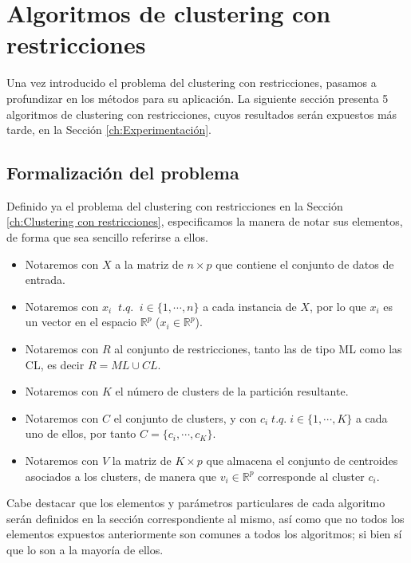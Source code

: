 \chapter{Algoritmos de clustering con restricciones}\label{ch:Algoritmos}

Una vez introducido el problema del clustering con restricciones, pasamos a profundizar en los métodos para su aplicación. La siguiente sección presenta 5 algoritmos de clustering con restricciones, cuyos resultados serán expuestos más tarde, en la Sección \ref{ch:Experimentación}.

\section{Formalización del problema}

Definido ya el problema del clustering con restricciones en la Sección \ref{ch:Clustering con restricciones}, especificamos la manera de notar sus elementos, de forma que sea sencillo referirse a ellos.

\begin{itemize}
	
	\item Notaremos con $X$ a la matriz de $n\times p$ que contiene el conjunto de datos de entrada.
	
	\item Notaremos con $x_i \;\; t.q. \;\; i \in \{1, \cdots, n\}$ a cada instancia de $X$, por lo que $x_i$ es un vector en el espacio $\mathbb{R}^p$ ($x_i \in \mathbb{R}^p$).
	
	\item Notaremos con $R$ al conjunto de restricciones, tanto las de tipo \acs{ML} como las \acs{CL}, es decir $R = ML \cup CL$. 
	
	\item Notaremos con $K$ el número de clusters de la partición resultante.
	
	\item Notaremos con $C$ el conjunto de clusters, y con $c_i \; t.q. \; i \in \{1, \cdots, K\}$ a cada uno de ellos, por tanto $C = \{c_i, \cdots, c_K\}$.
	
	\item Notaremos con $V$ la matriz de $K\times p$ que almacena el conjunto de centroides asociados a los clusters, de manera que $v_i \in \mathbb{R}^p$ corresponde al cluster $c_i$.
	
\end{itemize}
Cabe destacar que los elementos y parámetros particulares de cada algoritmo serán definidos en la sección correspondiente al mismo, así como que no todos los elementos expuestos anteriormente son comunes a todos los algoritmos; si bien sí que lo son a la mayoría de ellos.

